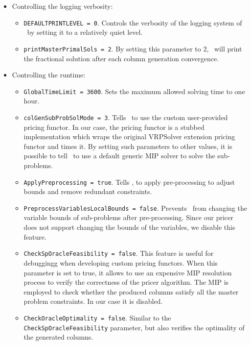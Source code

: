 \begin{itemize}
	\item Controlling the logging verbosity:
	      \begin{itemize}
		      \item \texttt{DEFAULTPRINTLEVEL = 0}.
		            Controls the verbosity of the logging system of \bapcod\ by setting it to a relatively quiet level.
		      \item \texttt{printMasterPrimalSols = 2}.
		            By setting this parameter to 2, \bapcod\ will print the fractional solution after each column generation convergence.
	      \end{itemize}

	\item Controlling the runtime:
	      \begin{itemize}
		      \item \texttt{GlobalTimeLimit = 3600}. Sets the maximum allowed solving time to one hour.
		      \item \texttt{colGenSubProbSolMode = 3}. Tells \bapcod\ to use the custom user-provided pricing functor.
		            In our case, the pricing functor is a stubbed implementation which wraps the original VRPSolver extension pricing functor
		            and times it.
		            By setting such parameters to other values, it is possible to tell \bapcod\ to use a default generic MIP solver to solve the sub-problems.
		      \item \texttt{ApplyPreprocessing = true}. Tells \bapcod, to apply pre-processing to adjust bounds and remove redundant constraints.
		      \item \texttt{PreprocessVariablesLocalBounds = false}.
		            Prevents \bapcod\ from changing the variable bounds of sub-problems after pre-processing.
		            Since our pricer does not support changing the bounds of the variables,
		            we disable this feature.
		      \item \texttt{CheckSpOracleFeasibility = false}.
		            This feature is useful for debuggingg when developing custom pricing functors.
		            When this parameter is set to true, it allows to use an expensive MIP resolution process
		            to verify the correctness of the pricer algorithm.
		            The MIP is employed to check whether the produced columns satisfy all the master problem constraints.
		            In our case it is disabled.
		      \item \texttt{CheckOracleOptimality = false}.
		            Similar to the \texttt{CheckSpOracleFeasibility} parameter, but also verifies the optimality of the generated columns.
	      \end{itemize}


\end{itemize}

